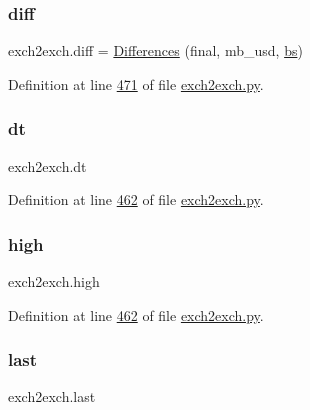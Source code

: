 \mbox{\label{namespaceexch2exch_a588ff4447b7d1ff41ea1d80c3d59005a}} 
\subsubsection{\texorpdfstring{diff}{diff}}
{\footnotesize\ttfamily exch2exch.\+diff = \hyperlink{classexch2exch_1_1_differences}{Differences} (final, mb\+\_\+usd, \hyperlink{namespaceexch2exch_a9cd4f02f37c459c12546f4552a54f5fc}{bs})}



Definition at line \hyperlink{exch2exch_8py_source_l00471}{471} of file \hyperlink{exch2exch_8py_source}{exch2exch.\+py}.

\mbox{\label{namespaceexch2exch_ab2b0f5888343e46aef72751a4be48b71}} 
\subsubsection{\texorpdfstring{dt}{dt}}
{\footnotesize\ttfamily exch2exch.\+dt}



Definition at line \hyperlink{exch2exch_8py_source_l00462}{462} of file \hyperlink{exch2exch_8py_source}{exch2exch.\+py}.

\mbox{\label{namespaceexch2exch_ace0a1a9df842ce16d0f0d7da40f6c1a4}} 
\subsubsection{\texorpdfstring{high}{high}}
{\footnotesize\ttfamily exch2exch.\+high}



Definition at line \hyperlink{exch2exch_8py_source_l00462}{462} of file \hyperlink{exch2exch_8py_source}{exch2exch.\+py}.

\mbox{\label{namespaceexch2exch_add3246fb611f3a6c35f10498f21c10ba}} 
\subsubsection{\texorpdfstring{last}{last}}
{\footnotesize\ttfamily exch2exch.\+last}



